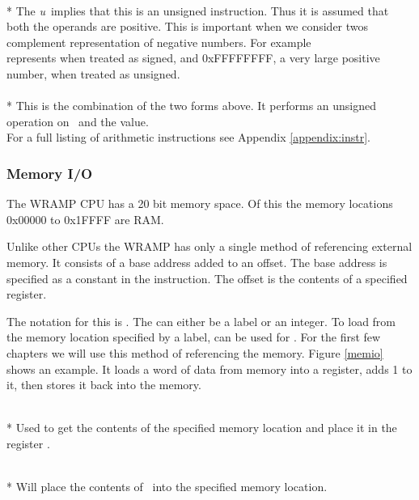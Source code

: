  \\* 
  The \emph{u}\ implies that this is
  an unsigned instruction.  Thus it is assumed that both the operands
  are positive.  This is important when we consider twos complement
  representation of negative numbers.  For example \\ \mbox{} represents  when
  treated as signed, and 0xFFFFFFFF, a very large positive number,
  when treated as unsigned.  \\

 \\*
  This is the combination of the two forms above.  It performs an unsigned
  operation on \regs\ and the  value.
  \\

For a full listing of arithmetic instructions see  Appendix 
\ref{appendix:instr}.


\subsubsection{Memory I/O}
The WRAMP CPU has a 20 bit memory space.  Of this the memory locations 
0x00000 to 0x1FFFF are RAM.

Unlike other CPUs the WRAMP has only a single method of referencing
external memory.  It consists of a base address added to an offset.
The base address is specified as a constant in the instruction.  The
offset is the contents of a specified register.

The notation for this is .  The  can either
be a label or an integer.  To load from the memory location specified
by a label,  can be used for \regs.  For the first few chapters
we will use this method of referencing the memory. Figure \ref{memio}
shows an example. It loads a word of data from memory into a register,
adds 1 to it, then stores it back into the memory.


\\*
Used to get the contents of the specified memory location and place it 
in the register \regd.

\\*
Will place the contents of \regd\ into the specified memory location.
\\


